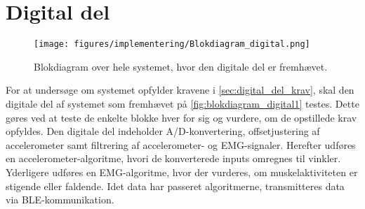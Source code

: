 \section{Digital del}
\begin{figure}[H]
\centering
\texttt{[image: figures/implementering/Blokdiagram\_digital.png]}
\caption{Blokdiagram over hele systemet, hvor den digitale del er fremhævet.}
\label{fig:blokdiagram_digital1}
\end{figure}

For at undersøge om systemet opfylder kravene i \autoref{sec:digital_del_krav}, skal den digitale del af systemet som fremhævet på \autoref{fig:blokdiagram_digital1} testes. 
Dette gøres ved at teste de enkelte blokke hver for sig og vurdere, om de opstillede krav opfyldes. 
Den digitale del indeholder A/D-konvertering, offsetjustering af accelerometer samt filtrering af accelerometer- og EMG-signaler. 
Herefter udføres en accelerometer-algoritme, hvori de konverterede inputs omregnes til vinkler. 
Yderligere udføres en EMG-algoritme, hvor der vurderes, om muskelaktiviteten er stigende eller faldende. 
Idet data har passeret algoritmerne, transmitteres data via BLE-kommunikation.